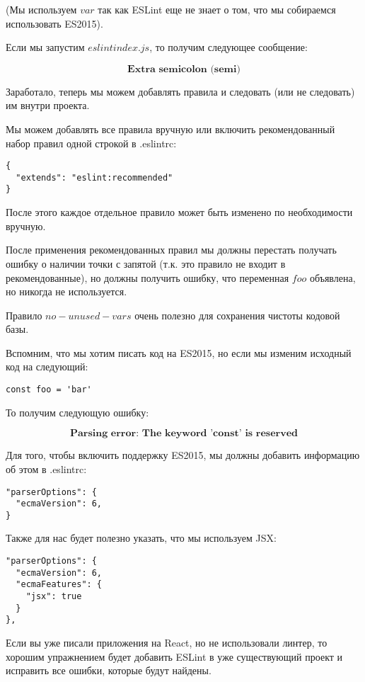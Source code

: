 \documentclass[12pt]{book}
\begin{document}
(Мы используем $var$ так как ESLint еще не знает о том, что мы собираемся использовать ES2015).

Если мы запустим $eslint index.js$, то получим следующее сообщение:

$$\textbf{Extra semicolon (semi)}$$

Заработало, теперь мы можем добавлять правила и следовать (или не следовать) им внутри проекта.

Мы можем добавлять все правила вручную или включить рекомендованный набор правил одной строкой в .eslintrc:

\begin{lstlisting}
{
  "extends": "eslint:recommended"
}
\end{lstlisting}

После этого каждое отдельное правило может быть изменено по необходимости вручную.

После применения рекомендованных правил мы должны перестать получать ошибку о наличии точки с запятой (т.к. это правило не входит в рекомендованные), но должны получить ошибку, что переменная $foo$ объявлена, но никогда не используется.

Правило $no-unused-vars$ очень полезно для сохранения чистоты кодовой базы.

Вспомним, что мы хотим писать код на ES2015, но если мы изменим исходный код на следующий:

\begin{lstlisting}
const foo = 'bar'
\end{lstlisting}

То получим следующую ошибку:

$$
\textbf{Parsing error: The keyword 'const' is reserved}
$$

Для того, чтобы включить поддержку ES2015, мы должны добавить информацию об этом в .eslintrc:

\begin{lstlisting}
"parserOptions": {
  "ecmaVersion": 6,
}
\end{lstlisting}

Также для нас будет полезно указать, что мы используем JSX:

\begin{lstlisting}
"parserOptions": {
  "ecmaVersion": 6,
  "ecmaFeatures": {
    "jsx": true 
  }
},
\end{lstlisting}

Если вы уже писали приложения на React, но не использовали линтер, то хорошим упражнением будет добавить ESLint в уже существующий проект и исправить все ошибки, которые будут найдены.
\end{document}
